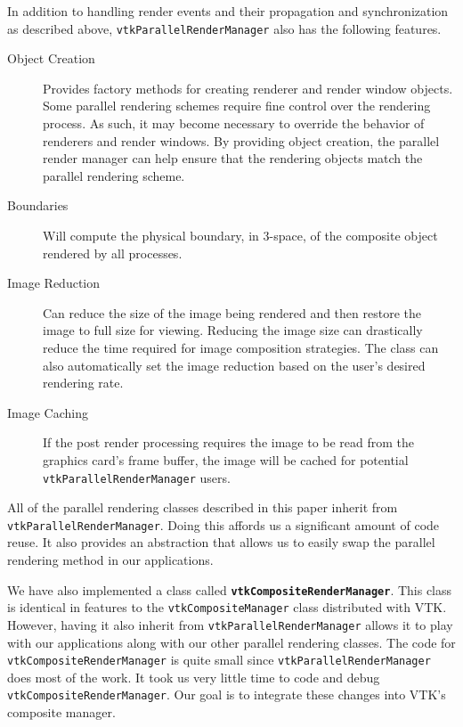 \documentclass[letterpaper]{acmsiggraph}
\newcommand{\cidentifier}[1]{\texttt{#1}}
\newcommand{\keyterm}[1]{\textbf{#1}}
\begin{document}
  In addition to handling render events and their propagation and
  synchronization as described above,
  \cidentifier{vtk\-Parallel\-Render\-Manager} also has the following
  features.
  \begin{description}
    \item [Object Creation] Provides factory methods for creating renderer
      and render window objects.  Some parallel rendering schemes require
      fine control over the rendering process.  As such, it may become
      necessary to override the behavior of renderers and render windows.
      By providing object creation, the parallel render manager can help
      ensure that the rendering objects match the parallel rendering
      scheme.
    \item [Boundaries] Will compute the physical boundary, in 3-space, of
      the composite object rendered by all processes.
    \item [Image Reduction] Can reduce the size of the image being rendered
      and then restore the image to full size for viewing.  Reducing the
      image size can drastically reduce the time required for image
      composition strategies.  The class can also automatically set the
      image reduction based on the user's desired rendering rate.
    \item [Image Caching] If the post render processing requires the image
      to be read from the graphics card's frame buffer, the image will be
      cached for potential \cidentifier{vtk\-Parallel\-Render\-Manager}
      users.
  \end{description}

  All of the parallel rendering classes described in this paper inherit
  from \cidentifier{vtk\-Parallel\-Render\-Manager}.  Doing this affords us
  a significant amount of code reuse.  It also provides an abstraction that
  allows us to easily swap the parallel rendering method in our
  applications.

  We have also implemented a class called
  \keyterm{\cidentifier{vtk\-Composite\-Render\-Manager}}.  This class is
  identical in features to the \cidentifier{vtk\-Composite\-Manager} class
  distributed with VTK.  However, having it also inherit from
  \cidentifier{vtk\-Parallel\-Render\-Manager} allows it to play with our
  applications along with our other parallel rendering classes.  The code
  for \cidentifier{vtk\-Composite\-Render\-Manager} is quite small since
  \cidentifier{vtk\-Parallel\-Render\-Manager} does most of the work.  It
  took us very little time to code and debug
  \cidentifier{vtk\-Composite\-Render\-Manager}.  Our goal is to integrate
  these changes into VTK's composite manager.
\end{document}

